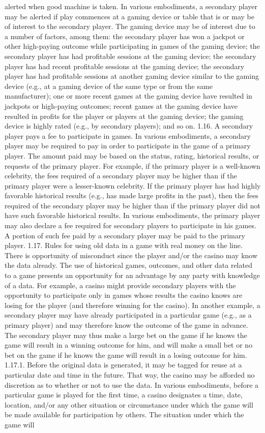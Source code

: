 \documentclass[11pt,a4paper]{article}
\begin{document}
alerted when good machine is taken. In various embodiments, a secondary player may be alerted if play commences at a gaming device or table that is or may be of interest to the secondary player. The gaming device may be of interest due to a number of factors, among them: the secondary player has won a jackpot or other high-paying outcome while participating in games of the gaming device; the secondary player has had profitable sessions at the gaming device; the secondary player has had recent profitable sessions at the gaming device; the secondary player has had profitable sessions at another gaming device similar to the gaming device (e.g., at a gaming device of the same type or from the same manufacturer); one or more recent games at the gaming device have resulted in jackpots or high-paying outcomes; recent games at the gaming device have resulted in profits for the player or players at the gaming device; the gaming device is highly rated (e.g., by secondary players); and so on. 1.16. A secondary player pays a fee to participate in games. In various embodiments, a secondary player may be required to pay in order to participate in the game of a primary player. The amount paid may be based on the status, rating, historical results, or requests of the primary player. For example, if the primary player is a well-known celebrity, the fees required of a secondary player may be higher than if the primary player were a lesser-known celebrity. If the primary player has had highly favorable historical results (e.g., has made large profits in the past), then the fees required of the secondary player may be higher than if the primary player did not have such favorable historical results. In various embodiments, the primary player may also declare a fee required for secondary players to participate in his games. A portion of such fee paid by a secondary player may be paid to the primary player. 1.17. Rules for using old data in a game with real money on the line. There is opportunity of misconduct since the player and/or the casino may know the data already. The use of historical games, outcomes, and other data related to a game presents an opportunity for an advantage by any party with knowledge of a data. For example, a casino might provide secondary players with the opportunity to participate only in games whose results the casino knows are losing for the player (and therefore winning for the casino). In another example, a secondary player may have already participated in a particular game (e.g., as a primary player) and may therefore know the outcome of the game in advance. The secondary player may thus make a large bet on the game if he knows the game will result in a winning outcome for him, and will make a small bet or no bet on the game if he knows the game will result in a losing outcome for him. 1.17.1. Before the original data is generated, it may be tagged for reuse at a particular date and time in the future. That way, the casino may be afforded no discretion as to whether or not to use the data. In various embodiments, before a particular game is played for the first time, a casino designates a time, date, location, and/or any other situation or circumstance under which the game will be made available for participation by others. The situation under which the game will 
\end{document}
